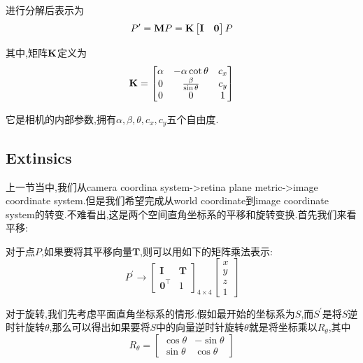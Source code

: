 进行分解后表示为
\begin{equation}
	P^\prime = \bold{M} P = \bold{K} \begin{bmatrix}
		\bold{I} & \bold{0}
	\end{bmatrix} P
\end{equation}

其中,矩阵$\bold{K}$定义为
\begin{equation}
	\bold{K} = \begin{bmatrix}
		\alpha & -\alpha \cot \theta & c_x
		\\
		0 & \frac{\beta}{\sin \theta} & c_y
		\\
		0 & 0 & 1
	\end{bmatrix}
\end{equation}

它是相机的内部参数,拥有$\alpha, \beta, \theta, c_x, c_y$五个自由度.

\subsection{Extinsics}
上一节当中,我们从camera coordina system->retina plane metric->image coordinate system.但是我们希望完成从world coordinate到image coordinate system的转变.不难看出,这是两个空间直角坐标系的平移和旋转变换.首先我们来看平移:

对于点$P$,如果要将其平移向量$\bm T$,则可以用如下的矩阵乘法表示:
\begin{equation}
	P^{\prime} \rightarrow\left[\begin{array}{ll}
		\mathbf{I} & \bm T \\
		\bm 0^\top & 1
	\end{array}\right]_{4 \times 4}\left[\begin{array}{c}
		x \\
		y \\
		z \\
		1
	\end{array}\right]
\end{equation}

对于旋转,我们先考虑平面直角坐标系的情形.假如最开始的坐标系为$S$,而$S^\prime$是将$S$逆时针旋转$\theta$,那么可以得出如果要将$S$中的向量逆时针旋转$\theta$就是将坐标乘以$R_\theta$,其中
\begin{equation}
	R_{\theta} = \begin{bmatrix}
		\cos \theta & - \sin \theta
		\\
		\sin\theta & \cos \theta
	\end{bmatrix}
\end{equation}


